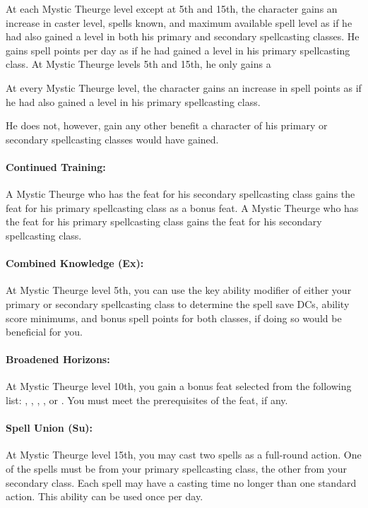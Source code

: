 At each Mystic Theurge level except at 5th and 15th, the character gains an increase in caster level, spells known, and maximum available spell level as if he had also gained a level in both his primary and secondary spellcasting classes. He gains spell points per day as if he had gained a level in his primary spellcasting class. At Mystic Theurge levels 5th and 15th, he only gains a 

At every Mystic Theurge level, the character gains an increase in spell points as if he had also gained a level in his primary spellcasting class.

He does not, however, gain any other benefit a character of his primary or secondary spellcasting classes would have gained.
\paragraph{Continued Training:} A Mystic Theurge who has the  feat for his secondary spellcasting class gains the feat for his primary spellcasting class as a bonus feat. A Mystic Theurge who has the feat for his primary spellcasting class gains the feat for his secondary spellcasting class.

\paragraph{Combined Knowledge (Ex):} At Mystic Theurge level 5th, you can use the key ability modifier of either your primary or secondary spellcasting class to determine the spell save DCs, ability score minimums, and bonus spell points for both classes, if doing so would be beneficial for you.

\paragraph{Broadened Horizons:} At Mystic Theurge level 10th, you gain a bonus feat selected from the following list: , , , ,  or . You must meet the prerequisites of the feat, if any.

\paragraph{Spell Union (Su):} At Mystic Theurge level 15th, you may cast two spells as a full-round action. One of the spells must be from your primary spellcasting class, the other from your secondary class. Each spell may have a casting time no longer than one standard action. This ability can be used once per day.